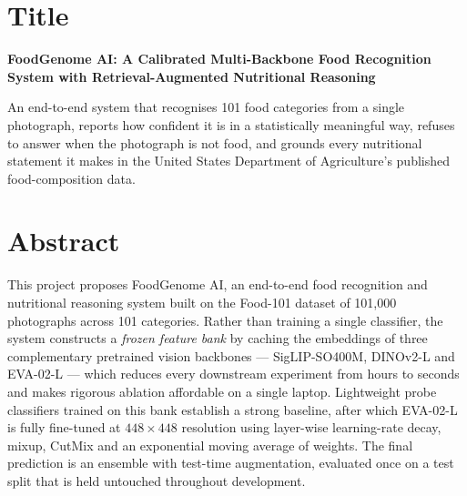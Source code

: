 \documentclass[12pt,a4paper,oneside]{report}
\begin{document}
\chapter*{Title}

\noindent\textbf{\large FoodGenome AI: A Calibrated Multi-Backbone Food Recognition
System with Retrieval-Augmented Nutritional Reasoning}

\vspace{0.8em}
\noindent An end-to-end system that recognises 101 food categories from a single
photograph, reports how confident it is in a statistically meaningful way,
refuses to answer when the photograph is not food, and grounds every nutritional
statement it makes in the United States Department of Agriculture's published
food-composition data.

\newpage
\tableofcontents

\chapter*{Abstract}

This project proposes FoodGenome AI, an end-to-end food recognition and
nutritional reasoning system built on the Food-101 dataset of 101{,}000
photographs across 101 categories. Rather than training a single classifier,
the system constructs a \emph{frozen feature bank} by caching the embeddings of
three complementary pretrained vision backbones --- SigLIP-SO400M, DINOv2-L and
EVA-02-L --- which reduces every downstream experiment from hours to seconds and
makes rigorous ablation affordable on a single laptop. Lightweight probe
classifiers trained on this bank establish a strong baseline, after which
EVA-02-L is fully fine-tuned at $448\times448$ resolution using layer-wise
learning-rate decay, mixup, CutMix and an exponential moving average of weights.
The final prediction is an ensemble with test-time augmentation, evaluated once
on a test split that is held untouched throughout development.
\end{document}

